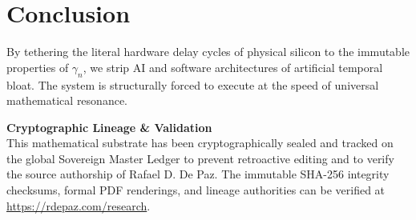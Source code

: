 \documentclass[12pt, a4paper]{article}
\begin{document}
\section{Conclusion}
By tethering the literal hardware delay cycles of physical silicon to the immutable properties of $\gamma_n$, we strip AI and software architectures of artificial temporal bloat. The system is structurally forced to execute at the speed of universal mathematical resonance.


\vspace{2em}
\noindent\hrulefill
\vspace{1em}

\noindent\textbf{Cryptographic Lineage \& Validation}\\
This mathematical substrate has been cryptographically sealed and tracked on the global Sovereign Master Ledger to prevent retroactive editing and to verify the source authorship of Rafael D. De Paz. The immutable SHA-256 integrity checksums, formal PDF renderings, and lineage authorities can be verified at \url{https://rdepaz.com/research}.



\end{document}
